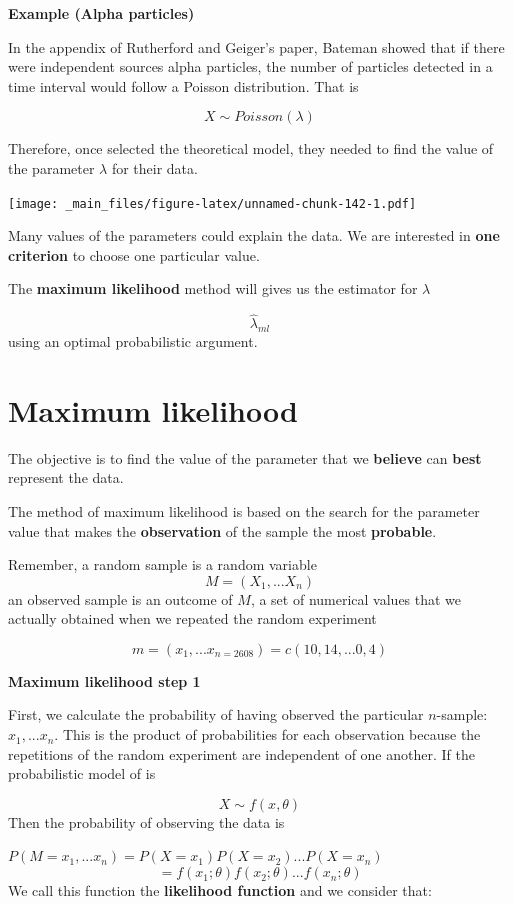 \documentclass[
]{book}
\begin{document}
\textbf{Example (Alpha particles)}

In the appendix of Rutherford and Geiger's paper, Bateman showed that if there were independent sources alpha particles, the number of particles detected in a time interval would follow a Poisson distribution. That is

\[X \sim Poisson (\lambda)\]

Therefore, once selected the theoretical model, they needed to find the value of the parameter \(\lambda\) for their data.

\texttt{[image: \_main\_files/figure-latex/unnamed-chunk-142-1.pdf]}

Many values of the parameters could explain the data. We are interested in \textbf{one criterion} to choose one particular value.

The \textbf{maximum likelihood} method will gives us the estimator for \(\lambda\)

\[\hat{\lambda}_{ml}\]
using an optimal probabilistic argument.

\hypertarget{maximum-likelihood-2}{%
\section{Maximum likelihood}\label{maximum-likelihood-2}}

The objective is to find the value of the parameter that we \textbf{believe} can \textbf{best} represent the data.

The method of maximum likelihood is based on the search for the parameter value that makes the \textbf{observation} of the sample the most \textbf{probable}.

Remember, a random sample is a random variable
\[M=(X_1,...X_n)\]
an observed sample is an outcome of \(M\), a set of numerical values that we actually obtained when we repeated the random experiment

\[m=(x_1,...x_{n=2608})=c(10, 14, ... 0, 4)\]

\textbf{Maximum likelihood step 1}

First, we calculate the probability of having observed the particular \(n\)-sample: \(x_1,...x_n\). This is the product of probabilities for each observation because the repetitions of the random experiment are independent of one another. If the probabilistic model of is

\[X \sim f(x, \theta)\]
Then the probability of observing the data is

\(P(M=x_1,...x_n)=P(X=x_1)P(X=x_2)...P(X=x_n)\)
\[=f(x_1;\theta)f(x_2;\theta) ...f(x_n;\theta)\]
We call this function the \textbf{likelihood function} and we consider that:
\end{document}
